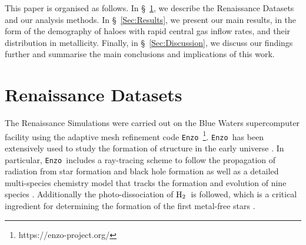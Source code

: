 \documentclass[graphics, twocolumn, usenatbib]{mn2e}
\newcommand{\enzo}{\texttt{Enzo~}}
\newcommand{\molH} {$\rm{H_2}$~}
\begin{document}
This paper is organised as follows.
In \S~\ref{Sec:RenaissanceDatasets}, we describe the Renaissance Datasets and our analysis methods.
In \S~\ref{Sec:Results}, we present  our main results, in the form of the demography of haloes with rapid central gas inflow rates, and their distribution in metallicity.  
Finally, in \S~\ref{Sec:Discussion}, 
we discuss our findings further and summarise the main conclusions and implications of this work.

\section{Renaissance Datasets} \label{Sec:RenaissanceDatasets}
The Renaissance Simulations were carried out on the Blue Waters supercomputer facility using the
adaptive mesh refinement code \enzo\citep{Enzo_2014, Enzo_2019}\footnote{https://enzo-project.org/}.
\enzo has been extensively used to study the formation of structure in the early universe
\citep{Abel_2002, OShea_2005b, Turk_2012, Wise_2012b, Wise_2014, Regan_2015, Regan_2017}. In
particular, \enzo includes a ray-tracing scheme to follow the propagation of radiation from star
formation and
black hole formation \citep{WiseAbel_2011} as well as a detailed multi-species chemistry model that
tracks the formation and evolution of nine species \citep{Anninos_1997, Abel_1997, Grackle}. Additionally the photo-dissociation of \molH is followed, which is a critical ingredient for
determining the formation of the first metal-free stars \citep{Abel_2000}. 
\end{document}

